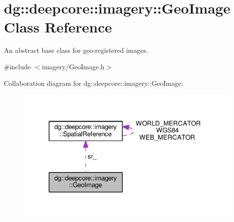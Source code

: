 \hypertarget{classdg_1_1deepcore_1_1imagery_1_1_geo_image}{}\section{dg\+:\+:deepcore\+:\+:imagery\+:\+:Geo\+Image Class Reference}
\label{classdg_1_1deepcore_1_1imagery_1_1_geo_image}


An abstract base class for geo-\/registered images.  




{\ttfamily \#include $<$imagery/\+Geo\+Image.\+h$>$}



Collaboration diagram for dg\+:\+:deepcore\+:\+:imagery\+:\+:Geo\+Image\+:
\nopagebreak
\begin{figure}[H]
\begin{center}
\leavevmode
\includegraphics[width=315pt]{classdg_1_1deepcore_1_1imagery_1_1_geo_image__coll__graph}
\end{center}
\end{figure}
